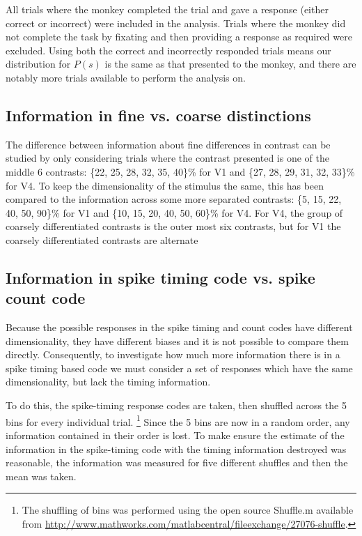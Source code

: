 All trials where the monkey completed the trial and gave a response (either correct or incorrect) were included in the analysis.
Trials where the monkey did not complete the task by fixating and then providing a response as required were excluded.
Using both the correct and incorrectly responded trials means our distribution for $P(s)$ is the same as that presented to the monkey, and there are notably more trials available to perform the analysis on.


\FloatBarrier
\subsection{Information in fine vs. coarse distinctions}

The difference between information about fine differences in contrast can be studied by only considering trials where the contrast presented is one of the middle 6 contrasts:
\{22, 25, 28, 32, 35, 40\}\% for \ac{V1} and
\{27, 28, 29, 31, 32, 33\}\% for \ac{V4}.
To keep the dimensionality of the stimulus the same, this has been compared to the information across some more separated contrasts:
 \{5, 15, 22, 40, 50, 90\}\% for \ac{V1} and
\{10, 15, 20, 40, 50, 60\}\% for \ac{V4}.
For \ac{V4}, the group of coarsely differentiated contrasts is the outer most six contrasts, but for \ac{V1} the coarsely differentiated contrasts are alternate

\FloatBarrier
\subsection{Information in spike timing code vs. spike count code}

Because the possible responses in the spike timing and count codes have different dimensionality, they have different biases \cite{Panzeri2007} and it is not possible to compare them directly.
Consequently, to investigate how much more information there is in a spike timing based code we must consider a set of responses which have the same dimensionality, but lack the timing information.

To do this, the spike-timing response codes are taken, then shuffled across the 5 bins for every individual trial.%
\footnote{The shuffling of bins was performed using the open source Shuffle.m
available from \url{http://www.mathworks.com/matlabcentral/fileexchange/27076-shuffle}.}
Since the 5 bins are now in a random order, any information contained in their order is lost.
To make ensure the estimate of the information in the spike-timing code with the timing information destroyed was reasonable, the information was measured for five different shuffles%
 and then the mean was taken.

